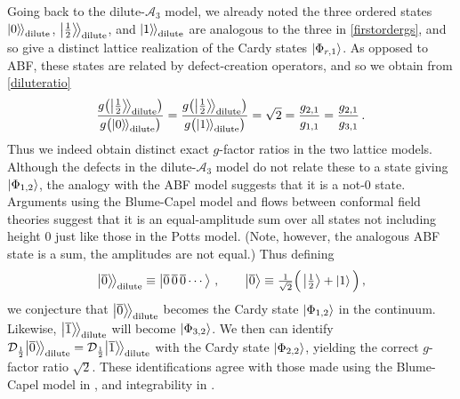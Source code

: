 Going back to the dilute-$\mathcal{A}_3$ model, we already noted the three ordered states ${|{0}\rangle\mkern-2mu\rangle}_{\rm dilute}$, ${\big|{\tfrac12}\big\rangle\!\big\rangle}_{\rm dilute}$, and ${|{1}\rangle\mkern-2mu\rangle}_{\rm dilute}$ are analogous to the three in \eqref{firstordergs}, and so give a distinct lattice realization of the Cardy states $\Ket{\Phi_{r,1}}$.
As opposed to ABF, these states are related by defect-creation operators, and so we obtain from \eqref{diluteratio}
\begin{align}
\frac{g\big({\big|{\tfrac12}\big\rangle\!\big\rangle}_{\rm dilute}\big)}{g\big({|{0}\rangle\mkern-2mu\rangle}_{\rm dilute}\big)} =
\frac{ g\big({\big|{\tfrac12}\big\rangle\!\big\rangle}_{\rm dilute}\big)}{g\big({|{1}\rangle\mkern-2mu\rangle}_{\rm dilute}\big)}  
= \sqrt{2} = \frac{g_{2,1}}{g_{1,1}}=  \frac{g_{2,1}}{g_{3,1}} \,.
\end{align}
Thus we indeed obtain distinct exact $g$-factor ratios in the two lattice models.
Although the defects in the dilute-$\mathcal{A}_3$ model do not relate these to a state giving $\Ket{\Phi_{1,2}}$, the analogy with the ABF model suggests that it is a not-$0$ state.
Arguments using the Blume-Capel model and flows between conformal field theories \cite{Chim1995,Affleck2000} suggest that it is an equal-amplitude sum over all states not including height $0$ just like those in the Potts model. (Note, however, the analogous ABF state is a sum, the amplitudes are not equal.) Thus defining
\begin{align}
	{\big|{\overline{0}}\big\rangle\!\big\rangle}_{\rm dilute} \equiv \Ket{\overline{0}\,\overline{0}\,\overline{0}\cdots}  \,,\qquad    \Ket{\overline{0}} \equiv \tfrac{1}{\sqrt{2}}\Big( \Ket{\tfrac12}+\ket{1}\Big)\,,
\label{not0state2}
\end{align}
we conjecture that ${\big|{\overline{0}}\big\rangle\!\big\rangle}_{\rm dilute}$ becomes the Cardy state $\Ket{\Phi_{1,2}}$ in the continuum.
Likewise, ${\big|{\overline{1}}\big\rangle\!\big\rangle}_{\rm dilute}$ will become $\Ket{\Phi_{3,2}}$.
We then can identify $\mathcal{D}_{\frac12}{\big|{\overline{0}}\big\rangle\!\big\rangle}_{\rm dilute}=
\mathcal{D}_{\frac12}{\big|{\overline{1}}\big\rangle\!\big\rangle}_{\rm dilute}$ with the Cardy state $\Ket{\Phi_{2,2}}$, yielding the correct $g$-factor ratio $\sqrt{2}$.
These identifications agree with those made using the Blume-Capel model in \cite{Chim1995,Affleck2000}, and integrability in \cite{Behrend2001}. 

